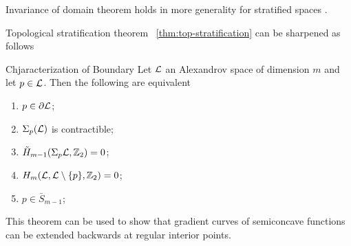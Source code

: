 Invariance of domain theorem holds in more generality for stratified spaces \cite[Theorem 3.2]{kapovitch-zhu}.

Topological stratification theorem ~\ref{thm:top-stratification} can be sharpened as follows

\begin{thm}{Chjaracterization of Boundary}\label{thm:boundary-kd}
Let $\mathcal{L}$ an Alexandrov space of dimension $m$  and let $p \in \mathcal{L}$.
Then the following are equivalent
\begin{enumerate}
\item \label{item-boundary} $p\in \partial \mathcal{L}$;
\item\label{item-contractible} $\Sigma_p(\mathcal{L})$ is contractible;
\item \label{item-space-dir-homology} $\tilde H_{m-1}(\Sigma_p \mathcal{L},\mathbb{Z}_2)= 0$;
\item \label{item-local-homology} $H_m( \mathcal{L},\mathcal{L}\setminus \{p\},\mathbb{Z}_2)= 0$;
\item \label{item-closure-top-strata}  $p\in \bar S_{m-1}$;



\end{enumerate}
\end{thm}


This theorem can be used to show that gradient curves of semiconcave functions can be extended backwards at regular interior points.


